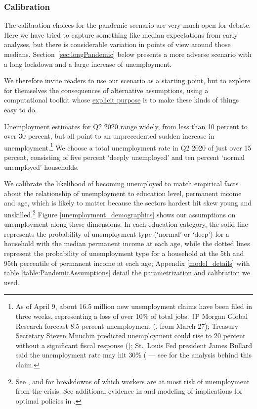 \subsubsection{Calibration}
The calibration choices for the pandemic scenario are very much open for debate. Here we have tried to capture something like median expectations from early analyses, but there is considerable variation in points of view around those medians. 
Section~\ref{sec:longPandemic} below presents a more adverse scenario with a long lockdown and a large increase of unemployment.

We therefore invite readers to use our scenario as a starting point, but to explore for themselves the consequences of alternative assumptions, using a computational toolkit whose \href{https://econ-ark.org/about}{explicit purpose} is to make these kinds of things easy to do.

Unemployment estimates for Q2 2020 range widely, from less than 10 percent to over 30 percent, but all point to an unprecedented sudden increase in unemployment.\footnote{As of April 9, about 16.5 million new unemployment claims have been filed in three weeks, representing a loss of over 10\% of total jobs.  JP Morgan Global Research forecast 8.5 percent unemployment (\cite{JPMorganBlog2020}, from March 27); Treasury Secretary Steven Mnuchin predicted unemployment could rise to 20 percent without a significant fiscal response (\cite{Bloomberg1}); St.\ Louis Fed president James Bullard said the unemployment rate may hit 30\% (\cite{Bloomberg2} --- see \cite{FariaBlog2020} for the analysis behind this claim.}
We choose a total unemployment rate in Q2 2020 of just over 15 percent, consisting of five percent `deeply unemployed' and ten percent `normal unemployed' households.

We calibrate the likelihood of becoming unemployed to match empirical facts about the relationship of unemployment to education level, permanent income and age, which is likely to matter because the sectors hardest hit skew young and unskilled.\footnote{See \cite{GasconCOVID2020}, \cite{LeiboviciSocial2020} and \cite{covid_USsurvey} for breakdowns of which workers are at most risk of unemployment from the crisis.
See additional evidence in \cite{kmv_pandemics} and modeling of implications for optimal policies in \cite{healthWealth}.}
Figure \ref{unemployment_demographics} shows our assumptions on unemployment along these dimensions.
In each education category, the solid line represents the probability of unemployment type (`normal' or `deep') for a household with the median permanent income at each age, while the dotted lines represent the probability of unemployment type for a household at the 5th and 95th percentile of permanent income at each age; Appendix \ref{model_details} with table \ref{table:PandemicAssumptions} detail the parametrization and calibration we used.

